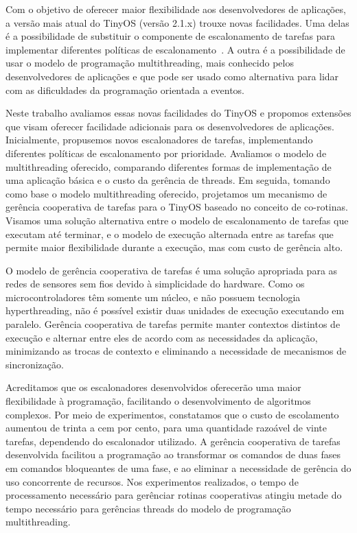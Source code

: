 Com o objetivo de oferecer maior flexibilidade aos desenvolvedores de aplicações, 
a versão mais atual do TinyOS (versão 2.1.x) trouxe novas facilidades.
Uma delas é a possibilidade de substituir o componente de escalonamento de tarefas
para implementar diferentes políticas de escalonamento~\cite{TEP106}.
A outra é a possibilidade de usar o modelo de programação multithreading,
 mais conhecido pelos desenvolvedores de aplicações e que pode
ser usado como alternativa para lidar com as dificuldades da programação orientada a eventos.

Neste trabalho avaliamos essas novas facilidades do TinyOS e propomos extensões que visam oferecer facilidade adicionais
para os desenvolvedores de aplicações.
Inicialmente, propusemos novos escalonadores de tarefas, implementando diferentes políticas de escalonamento por
prioridade. Avaliamos o modelo de multithreading oferecido, comparando diferentes formas de implementação
de uma aplicação básica e o custo da gerência de threads. Em seguida, tomando como base o modelo multithreading
oferecido, projetamos um mecanismo de gerência cooperativa de tarefas para o TinyOS baseado no conceito de co-rotinas.
Visamos uma solução alternativa entre o modelo de escalonamento de tarefas que executam até terminar, e o modelo de 
execução alternada entre as tarefas que permite maior flexibilidade durante a execução, mas com custo de gerência alto.

O modelo de gerência cooperativa de tarefas é uma solução apropriada para as redes de sensores sem fios devido à simplicidade
do hardware. Como os microcontroladores têm somente um núcleo, e não possuem tecnologia hyperthreading, não é possível 
existir duas unidades de execução executando em paralelo. Gerência cooperativa de tarefas permite manter contextos
distintos de execução e alternar entre eles de acordo com as necessidades da aplicação, minimizando as trocas de
contexto e eliminando a necessidade de mecanismos de sincronização.

Acreditamos que os escalonadores desenvolvidos oferecerão uma maior flexibilidade à programação, facilitando o
desenvolvimento de algoritmos complexos. Por meio de experimentos, constatamos que o custo de
escolamento aumentou de trinta a cem por cento, para uma quantidade razoável de vinte tarefas, dependendo do escalonador
utilizado.
A gerência cooperativa de tarefas desenvolvida facilitou a programação ao transformar os comandos de duas fases em
comandos bloqueantes de uma fase, e ao eliminar a necessidade de gerência do uso concorrente de recursos. 
Nos experimentos realizados, o tempo de processamento necessário para gerênciar rotinas cooperativas atingiu metade do
tempo necessário para gerências threads do modelo de programação multithreading.

